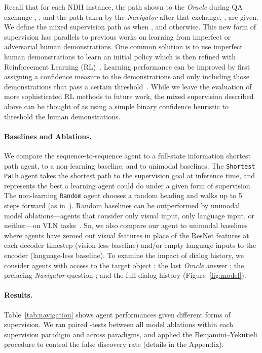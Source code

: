 \documentclass{article}
\newcommand{\task}{NDH}
\newcommand{\nav}{\textit{Navigator}}
\newcommand{\ora}{\textit{Oracle}}
\begin{document}
Recall that for each \task{} instance, the path shown to the \ora{} during QA exchange , , and the path taken by the \nav{} after that exchange, , are given.
We define the mixed supervision path  as  when , and  otherwise.
This new form of supervision has parallels to previous works on learning from imperfect or adversarial human demonstrations.
One common solution is to use imperfect human demonstrations to learn an initial policy which is then refined with Reinforcement Learning (RL)~\cite{taylor2011integrating}.
Learning performance can be improved by first assigning a confidence measure to the demonstrations and only including those demonstrations that pass a certain threshold~\cite{wang2017improving}.
While we leave the evaluation of more sophisticated RL methods to future work, the mixed supervision described above can be thought of as using a simple binary confidence heuristic to threshold the human demonstrations.

\paragraph{Baselines and Ablations.}
We compare the sequence-to-sequence agent to a full-state information shortest path agent, to a non-learning baseline, and to unimodal baselines.
The \texttt{Shortest Path} agent takes the shortest path to the supervision goal at inference time, and represents the best a learning agent could do under a given form of supervision.
The non-learning \texttt{Random} agent chooses a random heading and walks up to 5 steps forward (as in~\cite{anderson:cvpr18}).
Random baselines can be outperformed by unimodal model ablations---agents that consider only visual input, only language input, or neither---on VLN tasks~\cite{thomason:naacl19}.
So, we also compare our agent to unimodal baselines where agents have zeroed out visual features in place of the  ResNet features at each decoder timestep (vision-less baseline) and/or empty language inputs to the encoder (language-less baseline).
To examine the impact of dialog history, we consider agents with access to the target object ; the last \ora{} answer ; the prefacing \nav{} question ; and the full dialog history (Figure~\ref{fig:model}).

\paragraph{Results.}
Table~\ref{tab:navigation} shows agent performances given different forms of supervision.
We ran paired -tests between all model ablations within each supervision paradigm and across paradigms, and applied the Benjamini--Yekutieli procedure to control the false discovery rate (details in the Appendix).
\end{document}
